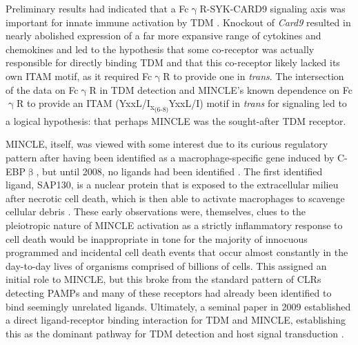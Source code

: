 Preliminary results had indicated that a Fc$\upgamma$R\hyp{}SYK\hyp{}CARD9 signaling axis was important for innate immune activation by TDM \citep{Werninghaus2009}. Knockout of \textit{Card9} resulted in nearly abolished expression of a far more expansive range of cytokines and chemokines and led to the hypothesis that some co\hyp{}receptor was actually responsible for directly binding TDM and that this co\hyp{}receptor likely lacked its own ITAM motif, as it required Fc$\upgamma$R to provide one in \textit{trans}. The intersection of the data on Fc$\upgamma$R in TDM detection \citep{Werninghaus2009} and MINCLE's known dependence on Fc$\upgamma$R to provide an ITAM (YxxL/I\textsubscript{x\textsubscript{(6\hyp{}8)}}YxxL/I) motif in \textit{trans} for signaling \citep{Yamasaki2008} led to a logical hypothesis: that perhaps MINCLE was the sought\hyp{}after TDM receptor.

MINCLE, itself, was viewed with some interest due to its curious regulatory pattern after having been identified as a macrophage\hyp{}specific gene induced by C\hyp{}EBP$\upbeta$, but until 2008, no ligands had been identified \citep{Balch1998, Akira1990}. The first identified ligand, SAP130, is a nuclear protein that is exposed to the extracellular milieu after necrotic cell death, which is then able to activate macrophages to scavenge cellular debris \citep{Yamasaki2008}. These early observations were, themselves, clues to the pleiotropic nature of MINCLE activation as a strictly inflammatory response to cell death would be inappropriate in tone for the majority of innocuous programmed and incidental cell death events that occur almost constantly in the day\hyp{}to\hyp{}day lives of organisms comprised of billions of cells. This assigned an initial role to MINCLE, but this broke from the standard pattern of CLRs detecting PAMPs and many of these receptors had already been identified to bind seemingly unrelated ligands. Ultimately, a seminal paper in 2009 established a direct ligand\hyp{}receptor binding interaction for TDM and MINCLE, establishing this as the dominant pathway for TDM detection and host signal transduction \citep{Ishikawa2009}. 

